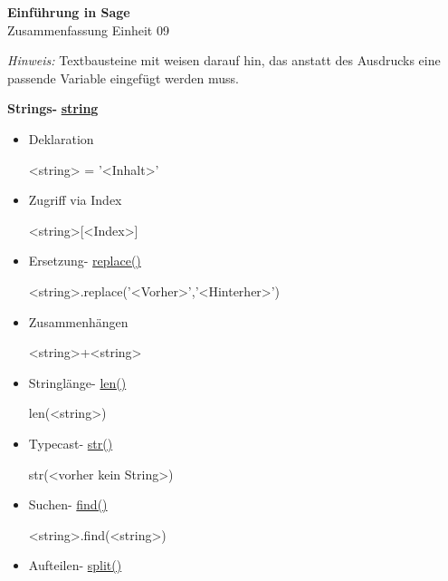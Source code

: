 \documentclass[a4paper,9pt,DIV15,twocolumn]{scrartcl}
\begin{document}
\begin{center}
    \textbf{\LARGE Einführung in Sage}\\
    {\large Zusammenfassung Einheit 09}
\end{center}
\textsl{Hinweis:} Textbausteine mit  weisen darauf hin, das anstatt des Ausdrucks eine passende Variable eingefügt werden muss.

\medskip

\textbf{Strings- }\href{http://docs.python.org/library/string.html?highlight=string.replace#string-constants}{\textbf{string}}

\begin{itemize}
 \item Deklaration
\begin{sagein}
<string> = '<Inhalt>'
\end{sagein}
\item Zugriff via Index
\begin{sagein}
<string>[<Index>]
\end{sagein}
\item Ersetzung- \href{http://docs.python.org/library/string.html?highlight=string.replace#string.replace}{replace()}
\begin{sagein}
<string>.replace('<Vorher>','<Hinterher>')
\end{sagein}
\item Zusammenhängen
\begin{sagein}
 <string>+<string>
\end{sagein}
\item Stringlänge- \href{http://docs.python.org/library/functions.html?highlight=print#len}{len()}
\begin{sagein}
 len(<string>)
\end{sagein}
\item Typecast- \href{http://docs.python.org/library/functions.html?highlight=print#str}{str()}
\begin{sagein}
str(<vorher kein String>)
\end{sagein}
\item Suchen- \href{http://docs.python.org/library/string.html?highlight=string.replace#string.find}{find()}
\begin{sagein}
 <string>.find(<string>)
\end{sagein}
\item Aufteilen- \href{http://docs.python.org/library/string.html?highlight=string.replace#string.split}{split()}
\begin{sagein}

\end{sagein}
\end{itemize}
\end{document}
